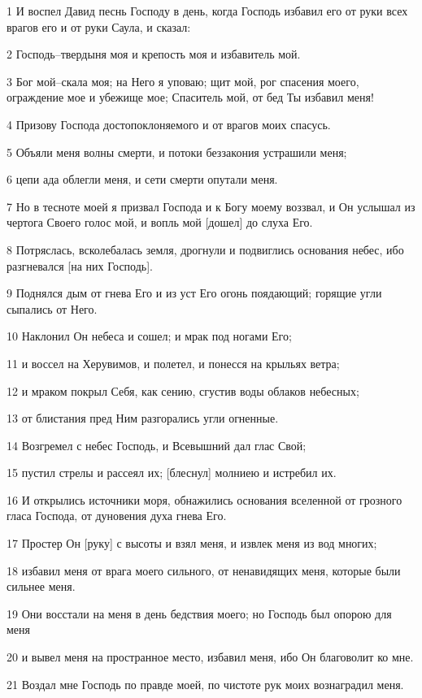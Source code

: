 \par 1 И воспел Давид песнь Господу в день, когда Господь избавил его от руки всех врагов его и от руки Саула, и сказал:
\par 2 Господь--твердыня моя и крепость моя и избавитель мой.
\par 3 Бог мой--скала моя; на Него я уповаю; щит мой, рог спасения моего, ограждение мое и убежище мое; Спаситель мой, от бед Ты избавил меня!
\par 4 Призову Господа достопоклоняемого и от врагов моих спасусь.
\par 5 Объяли меня волны смерти, и потоки беззакония устрашили меня;
\par 6 цепи ада облегли меня, и сети смерти опутали меня.
\par 7 Но в тесноте моей я призвал Господа и к Богу моему воззвал, и Он услышал из чертога Своего голос мой, и вопль мой [дошел] до слуха Его.
\par 8 Потряслась, всколебалась земля, дрогнули и подвиглись основания небес, ибо разгневался [на них Господь].
\par 9 Поднялся дым от гнева Его и из уст Его огонь поядающий; горящие угли сыпались от Него.
\par 10 Наклонил Он небеса и сошел; и мрак под ногами Его;
\par 11 и воссел на Херувимов, и полетел, и понесся на крыльях ветра;
\par 12 и мраком покрыл Себя, как сению, сгустив воды облаков небесных;
\par 13 от блистания пред Ним разгорались угли огненные.
\par 14 Возгремел с небес Господь, и Всевышний дал глас Свой;
\par 15 пустил стрелы и рассеял их; [блеснул] молниею и истребил их.
\par 16 И открылись источники моря, обнажились основания вселенной от грозного гласа Господа, от дуновения духа гнева Его.
\par 17 Простер Он [руку] с высоты и взял меня, и извлек меня из вод многих;
\par 18 избавил меня от врага моего сильного, от ненавидящих меня, которые были сильнее меня.
\par 19 Они восстали на меня в день бедствия моего; но Господь был опорою для меня
\par 20 и вывел меня на пространное место, избавил меня, ибо Он благоволит ко мне.
\par 21 Воздал мне Господь по правде моей, по чистоте рук моих вознаградил меня.

